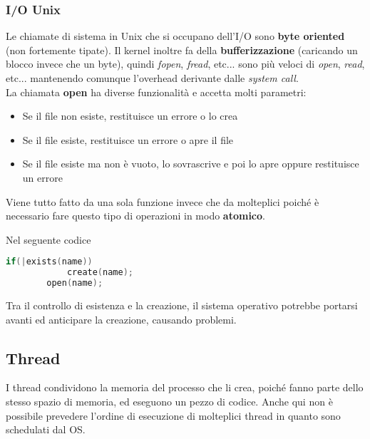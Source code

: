 \subsubsection{I/O Unix}
Le chiamate di sistema in Unix che si occupano dell'I/O sono \textbf{byte oriented} (non fortemente tipate). Il kernel inoltre fa della \textbf{bufferizzazione} (caricando un blocco invece che un byte), quindi \emph{fopen}, \emph{fread}, etc... sono più veloci di \emph{open}, \emph{read}, etc... mantenendo comunque l'overhead derivante dalle \emph{system call}.\\
La chiamata \textbf{open} ha diverse funzionalità e accetta molti parametri:
\begin{itemize}
	\item Se il file non esiste, restituisce un errore o lo crea
	\item Se il file esiste, restituisce un errore o apre il file
	\item Se il file esiste ma non è vuoto, lo sovrascrive e poi lo apre oppure restituisce un errore
\end{itemize}
Viene tutto fatto da una sola funzione invece che da molteplici poiché è necessario fare questo tipo di operazioni in modo \textbf{atomico}.
\begin{example}
	Nel seguente codice
	\begin{lstlisting}[language=C]
		if(|exists(name))
			create(name);
		open(name);
	\end{lstlisting}
	Tra il controllo di esistenza e la creazione, il sistema operativo potrebbe portarsi avanti ed anticipare la creazione, causando problemi.
\end{example}

\subsection{Thread}
I thread condividono la memoria del processo che li crea, poiché fanno parte dello stesso spazio di memoria, ed eseguono un pezzo di codice. Anche qui non è possibile prevedere l'ordine di esecuzione di molteplici thread in quanto sono schedulati dal OS.